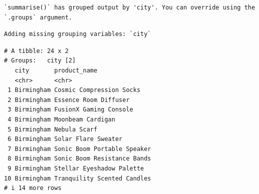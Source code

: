 \documentclass[
  letterpaper,
  DIV=11,
  numbers=noendperiod]{scrartcl}
\newenvironment{Shaded}{\begin{snugshade}}{\end{snugshade}}
\newcommand{\AttributeTok}[1]{\textcolor[rgb]{0.40,0.45,0.13}{#1}}
\newcommand{\CommentTok}[1]{\textcolor[rgb]{0.37,0.37,0.37}{#1}}
\newcommand{\DecValTok}[1]{\textcolor[rgb]{0.68,0.00,0.00}{#1}}
\newcommand{\FunctionTok}[1]{\textcolor[rgb]{0.28,0.35,0.67}{#1}}
\newcommand{\NormalTok}[1]{\textcolor[rgb]{0.00,0.23,0.31}{#1}}
\newcommand{\OtherTok}[1]{\textcolor[rgb]{0.00,0.23,0.31}{#1}}
\newcommand{\SpecialCharTok}[1]{\textcolor[rgb]{0.37,0.37,0.37}{#1}}
\begin{document}
\begin{Shaded}
\end{Shaded}

\begin{verbatim}
`summarise()` has grouped output by 'city'. You can override using the
`.groups` argument.
\end{verbatim}

\begin{Shaded}
\end{Shaded}

\begin{verbatim}
Adding missing grouping variables: `city`
\end{verbatim}

\begin{verbatim}
# A tibble: 24 x 2
# Groups:   city [2]
   city       product_name               
   <chr>      <chr>                      
 1 Birmingham Cosmic Compression Socks   
 2 Birmingham Essence Room Diffuser      
 3 Birmingham FusionX Gaming Console     
 4 Birmingham Moonbeam Cardigan          
 5 Birmingham Nebula Scarf               
 6 Birmingham Solar Flare Sweater        
 7 Birmingham Sonic Boom Portable Speaker
 8 Birmingham Sonic Boom Resistance Bands
 9 Birmingham Stellar Eyeshadow Palette  
10 Birmingham Tranquility Scented Candles
# i 14 more rows
\end{verbatim}
\end{document}
